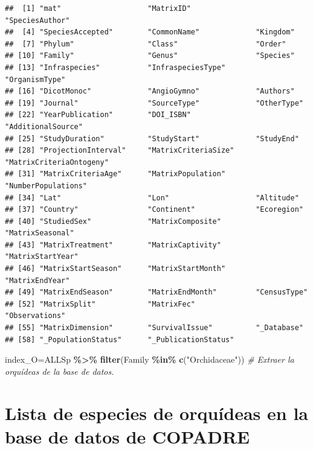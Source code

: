 \documentclass[
]{book}
\newenvironment{Shaded}{\begin{snugshade}}{\end{snugshade}}
\newcommand{\CommentTok}[1]{\textcolor[rgb]{0.56,0.35,0.01}{\textit{#1}}}
\newcommand{\FunctionTok}[1]{\textcolor[rgb]{0.13,0.29,0.53}{\textbf{#1}}}
\newcommand{\NormalTok}[1]{#1}
\newcommand{\OtherTok}[1]{\textcolor[rgb]{0.56,0.35,0.01}{#1}}
\newcommand{\SpecialCharTok}[1]{\textcolor[rgb]{0.81,0.36,0.00}{\textbf{#1}}}
\newcommand{\StringTok}[1]{\textcolor[rgb]{0.31,0.60,0.02}{#1}}
\theoremstyle{definition}
\theoremstyle{definition}
\theoremstyle{definition}
\theoremstyle{definition}
\theoremstyle{remark}
\begin{document}
\begin{verbatim}
##  [1] "mat"                    "MatrixID"               "SpeciesAuthor"         
##  [4] "SpeciesAccepted"        "CommonName"             "Kingdom"               
##  [7] "Phylum"                 "Class"                  "Order"                 
## [10] "Family"                 "Genus"                  "Species"               
## [13] "Infraspecies"           "InfraspeciesType"       "OrganismType"          
## [16] "DicotMonoc"             "AngioGymno"             "Authors"               
## [19] "Journal"                "SourceType"             "OtherType"             
## [22] "YearPublication"        "DOI_ISBN"               "AdditionalSource"      
## [25] "StudyDuration"          "StudyStart"             "StudyEnd"              
## [28] "ProjectionInterval"     "MatrixCriteriaSize"     "MatrixCriteriaOntogeny"
## [31] "MatrixCriteriaAge"      "MatrixPopulation"       "NumberPopulations"     
## [34] "Lat"                    "Lon"                    "Altitude"              
## [37] "Country"                "Continent"              "Ecoregion"             
## [40] "StudiedSex"             "MatrixComposite"        "MatrixSeasonal"        
## [43] "MatrixTreatment"        "MatrixCaptivity"        "MatrixStartYear"       
## [46] "MatrixStartSeason"      "MatrixStartMonth"       "MatrixEndYear"         
## [49] "MatrixEndSeason"        "MatrixEndMonth"         "CensusType"            
## [52] "MatrixSplit"            "MatrixFec"              "Observations"          
## [55] "MatrixDimension"        "SurvivalIssue"          "_Database"             
## [58] "_PopulationStatus"      "_PublicationStatus"
\end{verbatim}

\begin{Shaded}
\begin{Highlighting}[]
\NormalTok{index\_O}\OtherTok{=}\NormalTok{ALLSp }\SpecialCharTok{\%\textgreater{}\%} 
 \FunctionTok{filter}\NormalTok{(Family }\SpecialCharTok{\%in\%} \FunctionTok{c}\NormalTok{(}\StringTok{"Orchidaceae"}\NormalTok{)) }\CommentTok{\# Extraer la orquídeas de la base de datos. }
\end{Highlighting}
\end{Shaded}

\hypertarget{lista-de-especies-de-orquuxeddeas-en-la-base-de-datos-de-copadre}{%
\section{Lista de especies de orquídeas en la base de datos de COPADRE}\label{lista-de-especies-de-orquuxeddeas-en-la-base-de-datos-de-copadre}}
\end{document}
